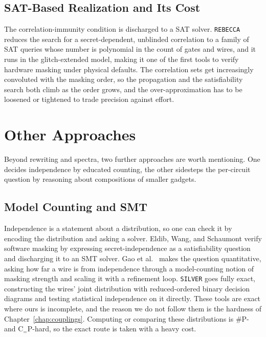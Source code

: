   \subsection{SAT-Based Realization and Its Cost}
  \label{sec:related-sat}

  The correlation-immunity condition is discharged to a SAT solver. \texttt{REBECCA}
  \parencite{bloem2018formal} reduces the search for a secret-dependent, unblinded
  correlation to a family of SAT queries whose number is polynomial in the count of
  gates and wires, and it runs in the glitch-extended model, making it one of the
  first tools to verify hardware masking under physical defaults. The correlation
  sets get increasingly convoluted with the masking order, so the propagation and
  the satisfiability search both climb as the order grows, and the over-approximation
  has to be loosened or tightened to trade precision against effort.

\section{Other Approaches}
\label{sec:related-other}

Beyond rewriting and spectra, two further approaches are worth mentioning. One decides
independence by educated counting, the other sidesteps the per-circuit question
by reasoning about compositions of smaller gadgets.

  \subsection{Model Counting and SMT}
  \label{sec:related-modelcounting}

  Independence is a statement about a distribution, so one can check it by encoding
  the distribution and asking a solver. Eldib, Wang, and Schaumont
  \parencite{eldib2014formal} verify software masking by expressing
  secret-independence as a satisfiability question and discharging it to an SMT
  solver. Gao et al.\ \parencite{gao2019verifying} makes the question quantitative,
  asking how far a wire is from independence through a model-counting notion of
  masking strength and scaling it with a refinement loop. \texttt{SILVER}
  \parencite{knichel2020silver} goes fully exact, constructing the wires' joint
  distribution with reduced-ordered binary decision diagrams and testing
  statistical independence on it directly. These tools are exact where ours is
  incomplete, and the reason we do not follow them is the hardness of
  Chapter~\ref{chap:couplings}. Computing or comparing these distributions is
  $\#\mathrm{P}$- and $\mathrm{C}_{=}\mathrm{P}$-hard, so the exact route is taken
  with a heavy cost.

